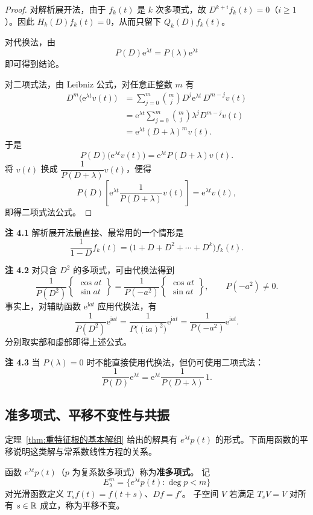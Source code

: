 \begin{proof}
	对解析展开法，由于 $f_k(t)$ 是 $k$ 次多项式，故
	$D^{k+i}f_k(t)=0$（$i\geq1$）。因此 $H_k(D)f_k(t)=0$，从而只留下
	$Q_k(D)f_k(t)$。

	对代换法，由
	\[
		P(D)\mathrm{e}^{\lambda t}=P(\lambda)\mathrm{e}^{\lambda t}
	\]
	即可得到结论。

	对二项式法，由 Leibniz 公式，对任意正整数 $m$ 有
	\[
		\begin{aligned}
		D^m\bigl(\mathrm{e}^{\lambda t}v(t)\bigr)
		&=\sum_{j=0}^{m}\binom{m}{j}
		D^j\mathrm{e}^{\lambda t}\,D^{m-j}v(t)\\
		&=\mathrm{e}^{\lambda t}
		\sum_{j=0}^{m}\binom{m}{j}\lambda^jD^{m-j}v(t)\\
		&=\mathrm{e}^{\lambda t}(D+\lambda)^mv(t).
		\end{aligned}
	\]
	于是
	\[
		P(D)\bigl(\mathrm{e}^{\lambda t}v(t)\bigr)
		=\mathrm{e}^{\lambda t}P(D+\lambda)v(t).
	\]
	将 $v(t)$ 换成 $\dfrac{1}{P(D+\lambda)}v(t)$，便得
	\[
		P(D)\left[
		\mathrm{e}^{\lambda t}\dfrac{1}{P(D+\lambda)}v(t)
		\right]
		=\mathrm{e}^{\lambda t}v(t),
	\]
	即得二项式法公式。
\end{proof}

\noindent\textbf{注 4.1}\quad
解析展开法最直接、最常用的一个情形是
\[
	\dfrac{1}{1-D}f_k(t)
	=\bigl(1+D+D^2+\cdots+D^k\bigr)f_k(t).
\]

\noindent\textbf{注 4.2}\quad
对只含 $D^2$ 的多项式，可由代换法得到
\[
	\dfrac{1}{P(D^2)}
	\begin{Bmatrix}
		\cos at\\
		\sin at
	\end{Bmatrix}
	=\dfrac{1}{P(-a^2)}
	\begin{Bmatrix}
		\cos at\\
		\sin at
	\end{Bmatrix},
	\qquad P(-a^2)\neq0.
\]
事实上，对辅助函数 $\mathrm{e}^{\mathrm{i}at}$ 应用代换法，有
\[
	\dfrac{1}{P(D^2)}\mathrm{e}^{\mathrm{i}at}
	=\dfrac{1}{P\bigl((\mathrm{i}a)^2\bigr)}\mathrm{e}^{\mathrm{i}at}
	=\dfrac{1}{P(-a^2)}\mathrm{e}^{\mathrm{i}at}.
\]
分别取实部和虚部即得上述公式。

\noindent\textbf{注 4.3}\quad
当 $P(\lambda)=0$ 时不能直接使用代换法，但仍可使用二项式法：
\[
	\dfrac{1}{P(D)}\mathrm{e}^{\lambda t}
	=\mathrm{e}^{\lambda t}\dfrac{1}{P(D+\lambda)}\,1.
\]

\subsection*{准多项式、平移不变性与共振}
\label{sec:quasipolynomials}
定理~\ref{thm:重特征根的基本解组} 给出的解具有 $e^{\lambda t}p(t)$ 的形式。下面用函数的平移说明这类解与常系数线性方程的关系。
\begin{definition}
函数 $e^{\lambda t}p(t)$（$p$ 为复系数多项式）称为\textbf{准多项式}。
记 $$E_\lambda^m=\{e^{\lambda t}p(t):\deg p<m\}$$
对光滑函数定义 $T_sf(t)=f(t+s)$、$Df=f'$。
子空间 $V$ 若满足 $T_sV=V$ 对所有 $s\in\mathbb{R}$ 成立，称为平移不变。
\end{definition}

